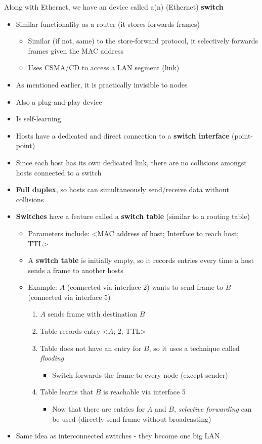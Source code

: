 \documentclass{article}
\begin{document}
Along with Ethernet, we have an device called a(n) (Ethernet) \textbf{switch}
\begin{itemize}
    \item Similar functionality as a router (it stores-forwards frames)
    \begin{itemize}
        \item Similar (if not, same) to the store-forward protocol, it selectively forwards frames
        given the MAC address
        \item Uses CSMA/CD to access a LAN segment (link)
    \end{itemize} 
    \item As mentioned earlier, it is practically invisible to nodes
    \item Also a plug-and-play device
    \item Is self-learning
    \item Hosts have a dedicated and direct connection to a \textbf{switch interface} (point-point)
    \item Since each host has its own dedicated link, there are no collisions amongst hosts connected 
    to a switch
    \item \textbf{Full duplex}, so hosts can simultaneously send/receive data without collisions
    \item \textbf{Switches} have a feature called a \textbf{switch table} (similar to a routing table)
    \begin{itemize}
        \item Parameters include: <MAC address of host; Interface to reach host; TTL>
        \item A \textbf{switch table} is initially empty, so it records entries every time a host
        sends a frame to another hosts
        \item Example: $A$ (connected via interface 2) wants to send frame to $B$ (connected via interface 5)
        \begin{enumerate}
            \item $A$ sends frame with destination $B$
            \item Table records entry <$A$; 2; TTL>
            \item Table does not have an entry for $B$, so it uses a technique called \textit{flooding}
            \begin{itemize}
                \item Switch forwards the frame to every node (except sender)
            \end{itemize}
            \item Table learns that $B$ is reachable via interface 5
            \begin{itemize}
                \item Now that there are entries for $A$ and $B$, \textit{selective forwarding} can be used
                (directly send frame without broadcasting)
            \end{itemize}
        \end{enumerate}
    \end{itemize}
    \item Same idea as interconnected switches - they become one big LAN
\end{itemize}
\end{document}
